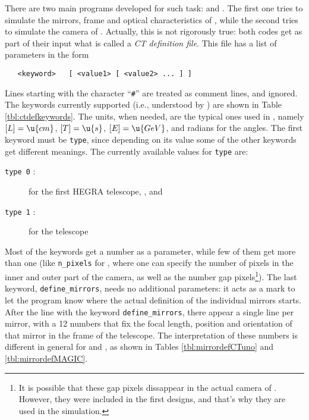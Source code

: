 There are two main programs developed for such task:  and
\camera. The first one tries to simulate the mirrors, frame and
optical characteristics of \MAGIC, while the second tries to simulate
the camera of \MAGIC. Actually, this is not rigorously true: both
codes get as part of their input what is called a \emph{CT definition
  file}. This file has a list of parameters in the form 
%
\begin{verbatim}
   <keyword>   [ <value1> [ <value2> ... ] ]
\end{verbatim}
%
Lines starting with the character ``\texttt{\#}'' are treated as
comment lines, and ignored. The keywords currently supported (i.e.,
understood by ) are shown in Table \ref{tbl:ctdefkeywords}.
The units, when needed, are the typical ones used in \CORSIKA, namely
$[L]=\u{cm}$, $[T]=\u{s}$, $[E]=\u{GeV}$, and radians for the angles.
The first keyword must be \texttt{type}, since depending on its value
some of the other keywords get different meanings. The currently
available values for \texttt{type} are:
%
\begin{description}
\item[\texttt{type 0} :] for the first HEGRA telescope, \CTuno, and
\item[\texttt{type 1} :] for the \MAGIC telescope
\end{description}
%
Most of the keywords get a number as a parameter, while few of them
get more than one (like \texttt{n\_pixels} for \MAGIC, where one can
specify the number of pixels in the inner and outer part of the
camera, as well as the number gap pixels\footnote{It is possible that
  these gap pixels dissappear in the actual camera of \MAGIC. However,
  they were included in the first designs, and that's why they are
  used in the simulation.}). The last keyword,
\texttt{define\_mirrors}, needs no additional parameters: it acts as a
mark to let the program know where the actual definition of the
individual mirrors starts. After the line with the keyword
\texttt{define\_mirrors}, there appear a single line per mirror, with
a 12 numbers that fix the focal length, position and orientation of
that mirror in the frame of the telescope. The interpretation of these
numbers is different in general for \MAGIC and \CTuno, as shown in
Tables \ref{tbl:mirrordefCTuno} and \ref{tbl:mirrordefMAGIC}.

\ctdefkeywordstbl

\mirrordefCTunotbl

\mirrordefMAGICtbl

